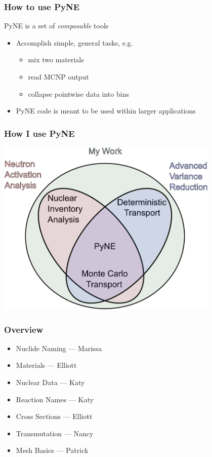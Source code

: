 \documentclass[12pt]{beamer}
\begin{document}
\begin{frame}[fragile]
\frametitle{How to use PyNE}

PyNE is a set of \emph{composable} tools
\begin{itemize}
\item Accomplish simple, general tasks, e.g.
\begin{itemize}
\item mix two materials
\item read MCNP output
\item collapse pointwise data into bins
\end{itemize}
\item PyNE code is meant to be used within larger applications
\end{itemize}

\end{frame}
\begin{frame}[fragile]
\frametitle{How I use PyNE}
\centerline{\includegraphics[width=0.8\textwidth]{coupling.pdf}}
\end{frame}
\begin{frame}[fragile]
\frametitle{Overview}

\begin{itemize}
\item Nuclide Naming --- Marissa
\item Materials --- Elliott
\item Nuclear Data --- Katy
\item Reaction Names --- Katy
\item Cross Sections --- Elliott
\item Transmutation --- Nancy
\item Mesh Basics --- Patrick
\end{itemize}

\end{frame}
%        
%        

\end{document}
